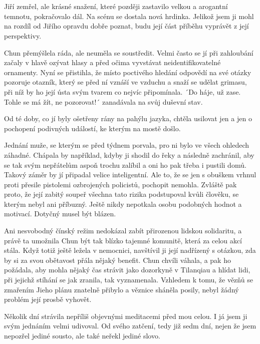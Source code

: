 \chapter{}

Jiří zemřel, ale krásné snažení, které později zastavilo velkou a arogantní temnotu, pokračovalo dál. Na scénu se dostala nová hrdinka. Jelikož jsem ji mohl na rozdíl od Jiřího opravdu dobře poznat, budu její část příběhu vyprávět z její perspektivy.
\vspace{0.75cm}

Chun přemýšlela ráda, ale neuměla se soustředit. Velmi často se jí při zahloubání začaly v hlavě ozývat hlasy a před očima vyvstávat neidentifikovatelné ornamenty. Nyní se přistihla, že místo poctivého hledání odpovědí na své otázky pozoruje otazník, který se před ní vznáší ve vzduchu a snaží se udělat grimasu, při níž by ho její ústa svým tvarem co nejvíc připomínala. ´Do háje, už zase. Tohle se má žít, ne pozorovat!´ zanadávala na svůj duševní stav.

Od té doby, co jí byly ošetřeny rány na pahýlu jazyka, chtěla usilovat jen a jen o pochopení podivných událostí, ke kterým na mostě došlo.

Jednání muže, se kterým se před týdnem porvala, pro ni bylo ve všech ohledech záhadné. Chápala by například, kdyby ji shodil do řeky a následně zachránil, aby se tak svým nepřátelům aspoň trochu zalíbil a oni ho pak třeba i pustili domů. Takový záměr by jí připadal velice inteligentní. Ale to, že se jen s obuškem vrhnul proti přesile pistolemi ozbrojených policistů, pochopit nemohla. Zvláště pak proto, že její zabitý soupeř všechna tato rizika podstupoval kvůli člověku, se kterým nebyl ani příbuzný. Ještě nikdy nepotkala osobu podobných hodnot a motivací. Dotyčný musel být blázen.

Ani nesvobodný čínský režim nedokázal zabít přirozenou lidskou solidaritu, a právě ta umožnila Chun být tak blízko tajemné komunitě, která za celou akcí stála. Když totiž ještě ležela v nemocnici, navštívil ji její nadřízený s otázkou, zda by si za svou obětavost přála nějaký benefit. Chun chvíli váhala, a pak ho požádala, aby mohla nějaký čas strávit jako dozorkyně v Tilanqiau a hlídat lidi, při jejichž stíhání se jak zranila, tak vyznamenala. Vzhledem k tomu, že vězňů se zmařením Jieho plánu znatelně přibylo a věznice sháněla posily, nebyl žádný problém její prosbě vyhovět.

Několik dní strávila nepříliš objevnými meditacemi před mou celou. I já jsem ji svým jednáním velmi udivoval. Od svého zatčení, tedy již sedm dní, nejen že jsem nepozřel jediné sousto, ale také neřekl jediné slovo. 

